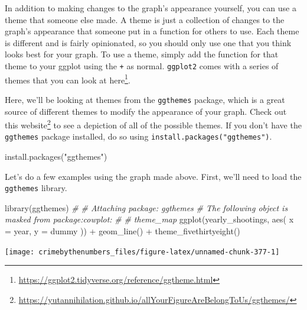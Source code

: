 \documentclass[
]{krantz}
\makeatletter
\newenvironment{Shaded}{\begin{snugshade}}{\end{snugshade}}
\newcommand{\AttributeTok}[1]{\textcolor[rgb]{0.61,0.61,0.61}{#1}}
\newcommand{\CommentTok}[1]{\textcolor[rgb]{0.37,0.37,0.37}{\textit{#1}}}
\newcommand{\FunctionTok}[1]{\textcolor[rgb]{0,0,0}{#1}}
\newcommand{\NormalTok}[1]{#1}
\newcommand{\SpecialCharTok}[1]{\textcolor[rgb]{0,0,0}{#1}}
\newcommand{\StringTok}[1]{\textcolor[rgb]{0.5,0.5,0.5}{#1}}
\renewcommand{\href}[2]{#2\footnote{\url{#1}}}
\newenvironment{kframe}{%
\medskip{}
\setlength{\fboxsep}{.8em}
 \def\at@end@of@kframe{}%
 \ifinner\ifhmode%
  \def\at@end@of@kframe{\end{minipage}}%
  \begin{minipage}{\columnwidth}%
 \fi\fi%
 \def\FrameCommand##1{\hskip\@totalleftmargin \hskip-\fboxsep
 \colorbox{shadecolor}{##1}\hskip-\fboxsep
     \hskip-\linewidth \hskip-\@totalleftmargin \hskip\columnwidth}%
 \MakeFramed {\advance\hsize-\width
   \@totalleftmargin\z@ \linewidth\hsize
   \@setminipage}}%
 {\par\unskip\endMakeFramed%
 \at@end@of@kframe}
\renewenvironment{Shaded}{\begin{kframe}}{\end{kframe}}
\makeatother
\begin{document}
In addition to making changes to the graph's appearance
yourself, you can use a theme that someone else made. A
theme is just a collection of changes to the graph's
appearance that someone put in a function for others to use.
Each theme is different and is fairly opinionated, so you
should only use one that you think looks best for your
graph. To use a theme, simply add the function for that
theme to your ggplot using the \texttt{+} as normal.
\texttt{ggplot2} comes with a series of themes that you can
look at
\href{https://ggplot2.tidyverse.org/reference/ggtheme.html}{here}.

Here, we'll be looking at themes from the \texttt{ggthemes}
package, which is a great source of different themes to
modify the appearance of your graph. Check out this
\href{https://yutannihilation.github.io/allYourFigureAreBelongToUs/ggthemes/}{website}
to see a depiction of all of the possible themes. If you
don't have the \texttt{ggthemes} package installed, do so
using \texttt{install.packages("ggthemes")}.

\begin{Shaded}
\begin{Highlighting}[]
\FunctionTok{install.packages}\NormalTok{(}\StringTok{"ggthemes"}\NormalTok{)}
\end{Highlighting}
\end{Shaded}

Let's do a few examples using the graph made above. First,
we'll need to load the \texttt{ggthemes} library.

\begin{Shaded}
\begin{Highlighting}[]
\FunctionTok{library}\NormalTok{(ggthemes)}
\CommentTok{\# }
\CommentTok{\# Attaching package: \textquotesingle{}ggthemes\textquotesingle{}}
\CommentTok{\# The following object is masked from \textquotesingle{}package:cowplot\textquotesingle{}:}
\CommentTok{\# }
\CommentTok{\#     theme\_map}
\FunctionTok{ggplot}\NormalTok{(yearly\_shootings, }\FunctionTok{aes}\NormalTok{(}
  \AttributeTok{x =}\NormalTok{ year,}
  \AttributeTok{y =}\NormalTok{ dummy}
\NormalTok{)) }\SpecialCharTok{+}
  \FunctionTok{geom\_line}\NormalTok{() }\SpecialCharTok{+}
  \FunctionTok{theme\_fivethirtyeight}\NormalTok{()}
\end{Highlighting}
\end{Shaded}

\begin{center}\texttt{[image: crimebythenumbers\_files/figure-latex/unnamed-chunk-377-1]} \end{center}
\end{document}
